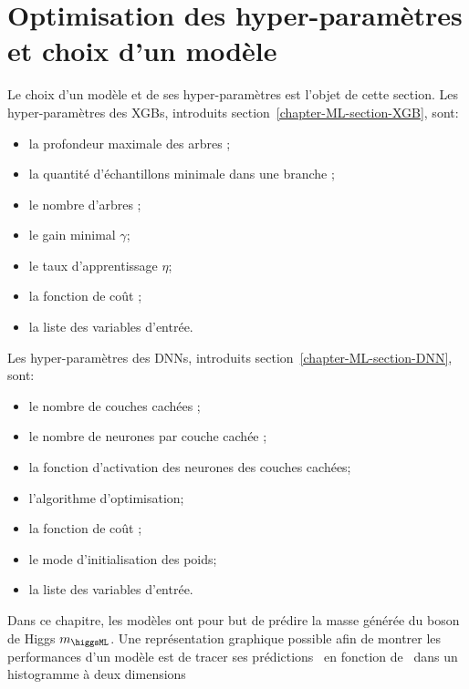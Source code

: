 \section{Optimisation des hyper-paramètres et choix d'un modèle}\label{chapter-ML-section-hyperparameters}
Le choix d'un modèle et de ses hyper-paramètres est l'objet de cette section.
Les hyper-paramètres des XGBs, introduits section~\ref{chapter-ML-section-XGB}, sont:
\begin{itemize}
\item la profondeur maximale des arbres \MaxDepth;
\item la quantité d'échantillons minimale dans une branche \MinChildWeight;
\item le nombre d'arbres \Nestimators;
\item le gain minimal $\gamma$;
\item le taux d'apprentissage $\eta$;
\item la fonction de coût \Loss;
\item la liste des variables d'entrée.
\end{itemize}
Les hyper-paramètres des DNNs, introduits section~\ref{chapter-ML-section-DNN}, sont:
\begin{itemize}
\item le nombre de couches cachées \NLayers;
\item le nombre de neurones par couche cachée \NNeurons;
\item la fonction d'activation des neurones des couches cachées;
\item l'algorithme d'optimisation;
\item la fonction de coût \Loss;
\item le mode d'initialisation des poids;
\item la liste des variables d'entrée.
\end{itemize}
\par
Dans ce chapitre,
les modèles ont pour but de prédire la masse générée du boson de Higgs $m_{\higgsML}$.
Une représentation graphique possible afin de montrer les performances d'un modèle est de tracer ses prédictions \ypred\ en fonction de \ytrue\ dans un histogramme à deux dimensions
